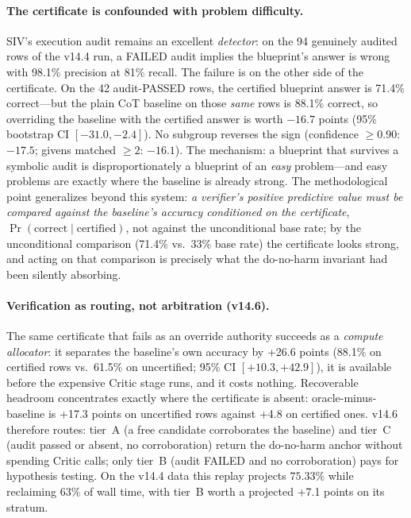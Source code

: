 \documentclass[11pt,a4paper]{article}
\begin{document}
\paragraph{The certificate is confounded with problem difficulty.}
SIV's execution audit remains an excellent \emph{detector}: on the 94 genuinely audited rows of the v14.4 run, a FAILED audit implies the blueprint's answer is wrong with 98.1\% precision at 81\% recall.
The failure is on the other side of the certificate.
On the 42 audit-PASSED rows, the certified blueprint answer is 71.4\% correct---but the plain CoT baseline on those \emph{same} rows is 88.1\% correct, so overriding the baseline with the certified answer is worth $-16.7$ points (95\% bootstrap CI $[-31.0, -2.4]$).
No subgroup reverses the sign (confidence $\geq 0.90$: $-17.5$; givens matched $\geq 2$: $-16.1$).
The mechanism: a blueprint that survives a symbolic audit is disproportionately a blueprint of an \emph{easy} problem---and easy problems are exactly where the baseline is already strong.
The methodological point generalizes beyond this system: \emph{a verifier's positive predictive value must be compared against the baseline's accuracy conditioned on the certificate}, $\Pr(\text{correct} \mid \text{certified})$, not against the unconditional base rate; by the unconditional comparison (71.4\% vs.\ 33\% base rate) the certificate looks strong, and acting on that comparison is precisely what the do-no-harm invariant had been silently absorbing.

\paragraph{Verification as routing, not arbitration (v14.6).}
The same certificate that fails as an override authority succeeds as a \emph{compute allocator}: it separates the baseline's own accuracy by +26.6 points (88.1\% on certified rows vs.\ 61.5\% on uncertified; 95\% CI $[+10.3, +42.9]$), it is available before the expensive Critic stage runs, and it costs nothing.
Recoverable headroom concentrates exactly where the certificate is absent: oracle-minus-baseline is +17.3 points on uncertified rows against +4.8 on certified ones.
v14.6 therefore routes: tier~A (a free candidate corroborates the baseline) and tier~C (audit passed or absent, no corroboration) return the do-no-harm anchor without spending Critic calls; only tier~B (audit FAILED and no corroboration) pays for hypothesis testing.
On the v14.4 data this replay projects $75.33\%$ while reclaiming 63\% of wall time, with tier~B worth a projected +7.1 points on its stratum.
\end{document}
